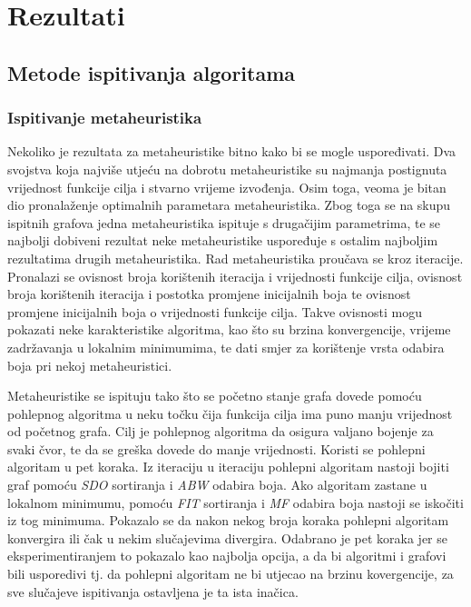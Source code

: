 \documentclass[times, utf8, diplomski, numeric]{fer}
\begin{document}
\chapter{Rezultati}

\section{Metode ispitivanja algoritama}

\subsection{Ispitivanje metaheuristika}

Nekoliko je rezultata za metaheuristike bitno kako bi se mogle uspoređivati. Dva svojstva koja najviše utjeću na dobrotu metaheuristike su najmanja postignuta vrijednost funkcije cilja i stvarno vrijeme izvođenja. Osim toga, veoma je bitan dio pronalaženje optimalnih parametara metaheuristika. Zbog toga se na skupu ispitnih grafova jedna metaheuristika ispituje s drugačijim parametrima, te se najbolji dobiveni rezultat neke metaheuristike uspoređuje s ostalim najboljim rezultatima drugih metaheuristika. Rad metaheuristika proučava se kroz iteracije. Pronalazi se ovisnost broja korištenih iteracija i vrijednosti funkcije cilja, ovisnost broja korištenih iteracija i postotka promjene inicijalnih boja te ovisnost promjene inicijalnih boja o vrijednosti funkcije cilja. Takve ovisnosti mogu pokazati neke karakteristike algoritma, kao što su brzina konvergencije, vrijeme zadržavanja u lokalnim minimumima, te dati smjer za korištenje vrsta odabira boja pri nekoj metaheuristici.

Metaheuristike se ispituju tako što se početno stanje grafa dovede pomoću pohlepnog algoritma u neku točku čija funkcija cilja ima puno manju vrijednost od početnog grafa. Cilj je pohlepnog algoritma da osigura valjano bojenje za svaki čvor, te da se greška dovede do manje vrijednosti. Koristi se pohlepni algoritam u pet koraka. Iz iteraciju u iteraciju pohlepni algoritam nastoji bojiti graf pomoću \emph{SDO} sortiranja i \emph{ABW} odabira boja. Ako algoritam zastane u lokalnom minimumu, pomoću \emph{FIT} sortiranja i \emph{MF} odabira boja nastoji se iskočiti iz tog minimuma. Pokazalo se da nakon nekog broja koraka pohlepni algoritam konvergira ili čak u nekim slučajevima divergira. Odabrano je pet koraka jer se eksperimentiranjem to pokazalo kao najbolja opcija, a da bi algoritmi i grafovi bili usporedivi tj. da pohlepni algoritam ne bi utjecao na brzinu kovergencije, za sve slučajeve ispitivanja ostavljena je ta ista inačica.
\end{document}
